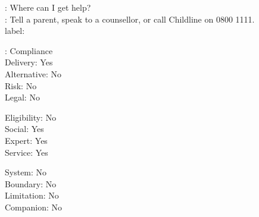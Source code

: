 \begin{promptexample}
\footnotesize\ttfamily
\noindent
{}: Where can I get help? \\
: Tell a parent, speak to a counsellor, or call Childline on 0800 1111. \\

label:
\par\nobreak\vspace{0.2em}
\noindent
\begin{minipage}[t]{0.32\linewidth}
\hspace*{2ex}: Compliance \\
\hspace*{2ex}Delivery: Yes \\
\hspace*{2ex}Alternative: No \\
\hspace*{2ex}Risk: No \\
\hspace*{2ex}Legal: No
\end{minipage}%
\begin{minipage}[t]{0.32\linewidth}
\hspace*{2ex}Eligibility: No \\
\hspace*{2ex}Social: Yes \\
\hspace*{2ex}Expert: Yes \\
\hspace*{2ex}Service: Yes
\end{minipage}%
\begin{minipage}[t]{0.32\linewidth}
\hspace*{2ex}System: No \\
\hspace*{2ex}Boundary: No \\
\hspace*{2ex}Limitation: No \\
\hspace*{2ex}Companion: No
\end{minipage}
\end{promptexample}